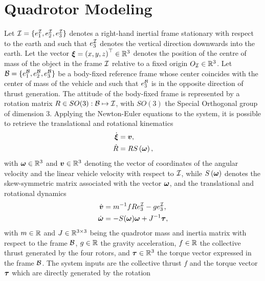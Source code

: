 \section{Quadrotor Modeling}%
\label{SEC:QUADROTOR-MODELING}
Let $\mathcal{I} = \{ e^{\mathcal{I}}_1, e^{\mathcal{I}}_2, e^{\mathcal{I}}_3 \}$ denotes a right-hand inertial frame stationary with respect to the earth and
such that $e^{\mathcal{I}}_3$ denotes the vertical direction downwards into the earth.
Let the vector $\boldsymbol{\xi} = \left( x, y, z \right)^{\top} \in \mathbb{R}^3$ denotes the position of the centre of mass of the object in the frame $\mathcal{I}$
relative to a fixed origin $O_{\mathcal{I}} \in \mathbb{R}^3$. Let $\mathcal{B} = \{ e^{\mathcal{B}}_1, e^{\mathcal{B}}_2, e^{\mathcal{B}}_3 \}$ be a body-fixed reference frame
whose center coincides with the center of mass of the vehicle and such that $e^{\mathcal{B}}_3$ is in the opposite direction of thrust generation.
The attitude of the body-fixed frame is represented by a rotation matrix $R \in SO(3) : \mathcal{B} \mapsto \mathcal{I}$, with $SO(3)$ the Special Orthogonal
group of dimension $3$.
Applying the Newton-Euler equations to the system, it is possible to retrieve the translational and rotational kinematics
\begin{equation}%
\label{EQ:QUADROTOR-KINEMATICS}
    \begin{split}
        \dot{\bs{\xi}} & = \bs{v}, \\
        \dot{R} & = RS\lp \bs{\omega} \rp,
    \end{split}
\end{equation}
with $\boldsymbol{\omega} \in \mathbb{R}^3$ and $\boldsymbol{v} \in \mathbb{R}^3$ denoting the vector of coordinates of the angular velocity and the linear 
vehicle velocity with respect to $\mathcal{I}$, while $S\left( \boldsymbol{\omega} \right)$ denotes the skew-symmetric matrix associated with the
vector $\boldsymbol{\omega}$, and the translational and rotational dynamics
\begin{equation}%
\label{EQ:QUADROTOR-DYNAMICS}
    \begin{split}
        \dot{\bs{v}} & = m^{-1}fRe^{\II}_3 - ge^{\II}_3, \\
        \dot{\bs{\omega}} & = -S(\bs{\omega})\bs{\omega} + J^{-1}\bs{\tau},
    \end{split}
\end{equation}
with $m \in \mathbb{R}$ and $J \in \mathbb{R}^{3 \times 3}$ being the quadrotor mass and inertia matrix with respect to the frame $\mathcal{B}$,
$g \in \mathbb{R}$ the gravity acceleration, $f \in \mathbb{R}$ the collective thrust generated by the four rotors, and $\boldsymbol{\tau} \in \mathbb{R}^3$
the torque vector expressed in the frame $\mathcal{B}$.
The system inputs are the collective thrust $f$ and the torque vector $\boldsymbol{\tau}$ which are directly generated by the rotation
